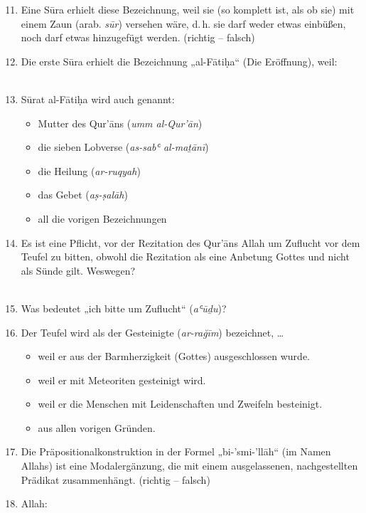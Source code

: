 \begin{enumerate}[leftmargin=1.6em]
\setcounter{enumi}{10}
\item Eine Sūra erhielt diese Bezeichnung, weil sie (so komplett ist, als ob sie) mit einem Zaun
  (arab. \emph{sūr}) versehen wäre, d.\,h. sie darf weder etwas einbüßen, noch darf etwas
  hinzugefügt werden. (richtig -- falsch)
\item Die erste Sūra erhielt die Bezeichnung „al-Fātiḥa“ (Die Eröffnung), weil:\\
  \hrulefill\\
  \hrulefill
\item Sūrat al-Fātiḥa wird auch genannt:
  \begin{itemize}
    \item Mutter des Qur’āns (\emph{umm al-Qur’ān})
    \item die sieben Lobverse (\emph{as-sabʿ al-maṯānī})
    \item die Heilung (\emph{ar-ruqyah})
    \item das Gebet (\emph{aṣ-ṣalāh})
    \item all die vorigen Bezeichnungen
  \end{itemize}
\item Es ist eine Pflicht, vor der Rezitation des Qur’āns Allah um Zuflucht vor dem Teufel zu
  bitten, obwohl die Rezitation als eine Anbetung Gottes und nicht als Sünde gilt. Weswegen?\\
  \hrulefill\\
  \hrulefill
\item Was bedeutet „ich bitte um Zuflucht“ (\emph{aʿūḏu})?\\
  \hrulefill
\item Der Teufel wird als der Gesteinigte (\emph{ar-rağīm}) bezeichnet, \ldots
  \begin{itemize}
    \item weil er aus der Barmherzigkeit (Gottes) ausgeschlossen wurde.
    \item weil er mit Meteoriten gesteinigt wird.
    \item weil er die Menschen mit Leidenschaften und Zweifeln besteinigt.
    \item aus allen vorigen Gründen.
  \end{itemize}
\item Die Präpositionalkonstruktion in der Formel „bi-’smi-’llāh“ (im Namen Allahs) ist eine
  Modalergänzung, die mit einem ausgelassenen, nachgestellten Prädikat zusammenhängt.
  (richtig -- falsch)
\item Allah:

\end{enumerate}
